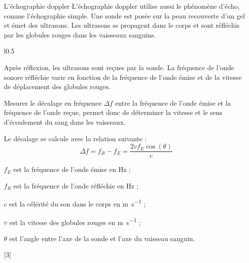\begin{doc}{L'échographie doppler}
  L'échographie doppler utilise aussi le phénomène d'écho, comme l'échographie simple.
  Une sonde est posée sur la peau recouverte d'un gel et émet des ultrasons.
  Les ultrasons se propagent dans le corps et sont réfléchis par les globules rouges dans les vaisseaux sanguins.

  \begin{wrapfigure}[10]{l}{0.5\linewidth}
    \centering
    \vspace*{-10pt}
  \end{wrapfigure}

  Après réflexion, les ultrasons sont reçues par la sonde.
  La fréquence de l'onde sonore réfléchie varie en fonction de la fréquence de l'onde émise et de la vitesse de déplacement des globules rouges.

  Mesurer le décalage en fréquence $\Delta f$ entre la fréquence de l'onde émise et la fréquence de l'onde reçue, permet donc de déterminer la vitesse et le sens d'écoulement du sang dans les vaisseaux.
  \vspace*{13pt}

  \begin{importants}
    Le décalage se calcule avec la relation suivante :
    \begin{equation*}
      \Delta f = f_R - f_E = \dfrac{2vf_E \cos(\theta)}{c}
    \end{equation*}
  \end{importants}
  
  \begin{listePoints}[2]
    \item $f_E$ est la fréquence de l'onde émise en \unit{\hertz} ;
    \item $f_R$ est la fréquence de l'onde réfléchie en \unit{\hertz} ;
    \item $c$ est la célérité du son dans le corps en \unit{\m\per\s} ;
    \item $v$ est la vitesse des globules rouges en \unit{\m\per\s} ;
    \item $\theta$ est l'angle entre l'axe de la sonde et l'axe du vaisseau sanguin.
  \end{listePoints}
\end{doc}


[3]


